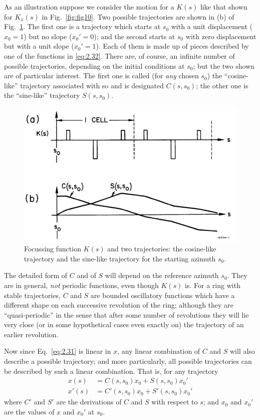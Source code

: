As an illustration suppose we consider the motion for a $K(s)$ like that shown for $K_x(s)$ in Fig.~\ref{fig:fig10}. Two possible trajectories are shown in (b) of Fig.~\ref{fig:fig11}. The first one is a trajectory which starts at $s_0$ with a unit displacement ($x_0 = 1$) but no slope ($x_0' = 0$); and the second starts at $s_0$ with zero displacement but with a unit slope ($x_0' = 1$). Each of them is made up of pieces described by one of the functions in \eqref{eq:2.32}. There are, of course, an infinite number of possible trajectories, depending on the initial conditions at $s_0$; but the two shown are of particular interest. The first one is called (for \textit{any} chosen $s_0$) the “cosine-like” trajectory associated with so and is designated $C(s,s_0)$; the other one is the “sine-like” trajectory $S(s,s_0)$.

\begin{figure}[!htb]
	\centering
	\includegraphics[width=0.7\linewidth]{./Figuras/fig11.jpeg}
	\caption{Focussing function $K(s)$ and two trajectories: the cosine-like trajectory and the sine-like trajectory for the starting azimuth $s_0$.}
	\label{fig:fig11}
\end{figure}

The detailed form of $C$ and of $S$ will depend on the reference azimuth $s_0$. They are in general, \textit{not} periodic functions, even though $K(s)$ is. For a ring with stable trajectories, $C$ and $S$ are bounded oscillatory functions which have a different shape on each successive revolution of the ring; although they are ``quasi-periodic'' in the sense that after some number of revolutions they will lie very close (or in some hypothetical cases even exactly on) the trajectory of an earlier revolution.

Now since Eq.~\eqref{eq:2.31} is linear in $x$, any linear combination of $C$ and $S$ will also describe a possible trajectory; and more particularly, all possible trajectories can be described by such a linear combination. That is, for any trajectory
\begin{align}
	x(s) &= C(s,s_0)x_0 + S(s,s_0)x_0'\\
	x'(s) &= C'(s,s_0)x_0 + S'(s,s_0)x_0'
\end{align}
where $C'$ and $S'$ are the derivations of $C$ and $S$ with respect to $s$; and $x_0$ and $x_0'$ are the values of $x$ and $x_0'$ at $s_0$.

